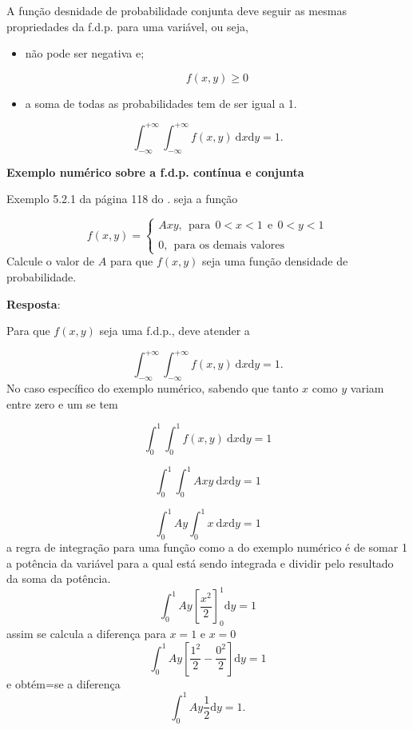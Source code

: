 \documentclass[
]{book}
\begin{document}
A função desnidade de probabilidade conjunta deve seguir as mesmas propriedades da f.d.p. para uma variável, ou seja,

\begin{itemize}
\item
  não pode ser negativa e;

  \[
    f(x,y) \geq 0
  \]
\item
  a soma de todas as probabilidades tem de ser igual a 1.
\end{itemize}

\[
  \int_{-\infty}^{+\infty}\int_{-\infty}^{+\infty}f(x,y)~\text{d}x \text{d}y = 1.
\]

\textbf{Exemplo numérico sobre a f.d.p. contínua e conjunta}

Exemplo 5.2.1 da página 118 do \citet{Sartoris2013}. seja a função

\begin{equation}
  f(x,y) = 
    \begin{cases}
      Axy,~~\text{para}~~0 < x < 1~~\text{e}~~0 < y < 1 \\
      \\
      0, ~~\text{para os demais valores}
    \end{cases}
\end{equation}
Calcule o valor de \(A\) para que \(f(x,y)\) seja uma função densidade de probabilidade.

\textbf{Resposta}:

Para que \(f(x,y)\) seja uma f.d.p., deve atender a

\[
  \int_{-\infty}^{+\infty}\int_{-\infty}^{+\infty}f(x,y)~\text{d}x \text{d}y = 1.
\]
No caso específico do exemplo numérico, sabendo que tanto \(x\) como \(y\) variam entre zero e um se tem

\[
  \int_{0}^{1}\int_{0}^{1}f(x,y)~\text{d}x \text{d}y = 1
\]

\[
  \int_{0}^{1}\int_{0}^{1}Axy ~\text{d}x \text{d}y = 1
\]

\[
  \int_{0}^{1}Ay\int_{0}^{1}x~\text{d}x \text{d}y = 1
\]
a regra de integração para uma função como a do exemplo numérico é de somar 1 a potência da variável para a qual está sendo integrada e dividir pelo resultado da soma da potência.
\[
  \int_{0}^{1}Ay\left[ \dfrac{x^2}{2} \right]_{0}^{1} \text{d}y = 1
\]
assim se calcula a diferença para \(x=1\) e \(x=0\)
\[
  \int_{0}^{1}Ay\left[ \dfrac{1^2}{2} - \dfrac{0^2}{2} \right] \text{d}y = 1
\]
e obtém=se a diferença
\[
  \int_{0}^{1}Ay\dfrac{1}{2} \text{d}y = 1.
\]
\end{document}
